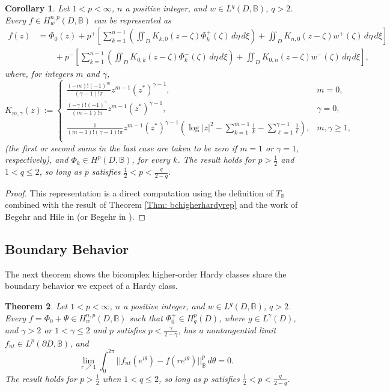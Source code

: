 \documentclass[suppldata]{interact}
\theoremstyle{plain}%
\newtheorem{theorem}{Theorem}[section]
\newtheorem{corr}[theorem]{Corollary}
\theoremstyle{definition}
\theoremstyle{remark}
\newcommand{\p}{\partial}
\newcommand{\bc}{\mathbb{B}}
\begin{document}
	\begin{corr}
		  Let $1< p < \infty$, $n$ a positive integer, and $w \in L^q(D,\bc)$, $q>2$. Every $f \in H^{n,p}_{w}(D,\bc)$ can be represented as 
		  \begin{align*}
		  	f(z) &= \Phi_0(z) + p^+\left[\sum_{k=1}^{n-1}   \left(\iint_D K_{k,0}(z-\zeta) \Phi^+_{k}(\zeta)\,d\eta\,d\xi \right) + \iint_D K_{n,0}(z-\zeta) w^+(\zeta)\,d\eta\,d\xi \right] \\
			&\quad \quad+  p^-\left[ \sum_{k=1}^{n-1} \left(\iint_{D}K_{0,k}(z-\zeta) \Phi_k^-(\zeta)\,d\eta\,d\xi \right)+ \iint_{D}K_{0,n}(z-\zeta) w^-(\zeta)\,d\eta\,d\xi\right],
		  \end{align*}
		   where, for integers $m$ and $\gamma$,
		   \[
		   	K_{m,\gamma}(z) := \begin{cases}
						\frac{(-m)! (-1)^m}{(\gamma-1)! \pi} z^{m-1} (z^*)^{\gamma-1}, & m = 0, \\
						\frac{(-\gamma)! (-1)^\gamma}{(m-1)! \pi} z^{m-1} (z^*)^{\gamma-1},  &  \gamma = 0,\\
						 \frac{1}{(m-1)! (\gamma-1)! \pi} z^{m-1} (z^*)^{\gamma-1} \left( \log|z|^2 - \sum_{k=1}^{m-1} \frac{1}{k} - \sum_{\ell = 1}^{\gamma-1} \frac{1}{\ell}\right), & m, \gamma \geq 1, \\
			\end{cases}
		   \]
		  (the first or second sums in the last case are taken to be zero if $m =1$ or $\gamma =1$, respectively),  and $\Phi_k \in H^p(D,\bc)$, for every $k$. The result holds for $p > \frac{1}{2}$ and $1 < q \leq 2$, so long as $p$ satisfies $\frac{1}{2} < p < \frac{q}{2-q}$. 
	\end{corr}
	
	\begin{proof}
		This representation is a direct computation using the definition of $T_\bc$ combined with the result of Theorem \ref{Thm: bchigherhardyrep} and the work of Begehr and Hile in \cite{hoio} (or Begehr in \cite{BegBook}).
	\end{proof}


\subsection{Boundary Behavior}

The next theorem shows the bicomplex higher-order Hardy classes share the boundary behavior we expect of a Hardy class. 

\begin{theorem}
    Let $1< p < \infty$, $n$ a positive integer, and $w \in L^q(D,\bc)$, $q>2$. Every $f = \Phi_0 + \Psi \in H^{n,p}_w(D,\bc)$ such that $\Phi_0^+ \in H^p_g(D)$, where $g \in L^\gamma(D)$, and $\gamma>2$ or $1 < \gamma \leq 2$ and $p$ satisfies $p < \frac{\gamma}{2-\gamma}$, has a nontangential limit $f_{nt} \in L^p(\p D, \bc)$, and 
    \[
        \lim_{r \nearrow 1} \int_0^{2\pi} ||f_{nt}(e^{i\theta}) - f(re^{i\theta}) ||^p_{\bc} \, d\theta  = 0. 
    \] 
     The result holds for $p > \frac{1}{2}$ when $1 < q \leq 2$, so long as $p$ satisfies $\frac{1}{2} < p < \frac{q}{2-q}$.
\end{theorem}
\end{document}
